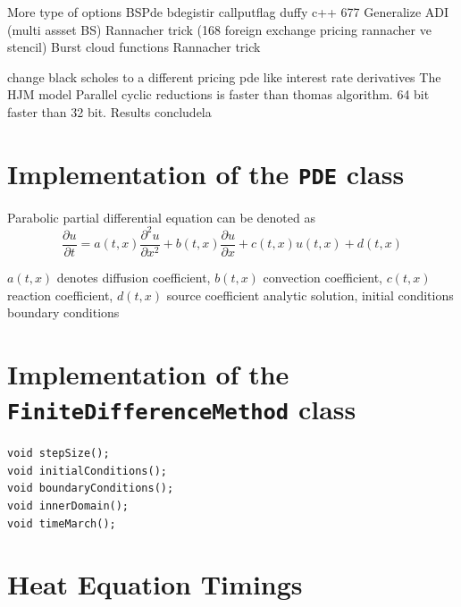 \documentclass[12pt, oneside]{book}
\theoremstyle{plain}
\theoremstyle{definition}
\begin{document}
More type of options BSPde bdegistir callputflag duffy c++ 677 
Generalize ADI (multi assset BS)
Rannacher trick (168 foreign exchange pricing rannacher ve stencil)
Burst cloud functions
Rannacher trick

change black scholes to a different pricing pde like interest rate derivatives The HJM model \cite{kohl}
Parallel cyclic reductions is faster than thomas algorithm. 64 bit faster than 32 bit. 
Results concludela

\appendix

\chapter{Implementation of the {\tt PDE} class}
Parabolic partial differential equation can be denoted as
$$ \frac{\partial u}{\partial t} = a(t,x) \frac{\partial^2 u}{\partial x^2} + b(t,x) \frac{\partial u}{\partial x} + c(t,x) u(t,x) + d(t,x) $$

$a(t,x)$ denotes diffusion coefficient,  $b(t,x)$ convection coefficient, $c(t,x)$ reaction coefficient, $d(t,x)$ source coefficient
analytic solution, initial conditions boundary conditions
\chapter{Implementation of the {\tt FiniteDifferenceMethod} class}

\begin{verbatim}
void stepSize();
void initialConditions();
void boundaryConditions();
void innerDomain();
void timeMarch();
\end{verbatim}

\chapter{Heat Equation Timings} \label{heatTime}
\end{document}
